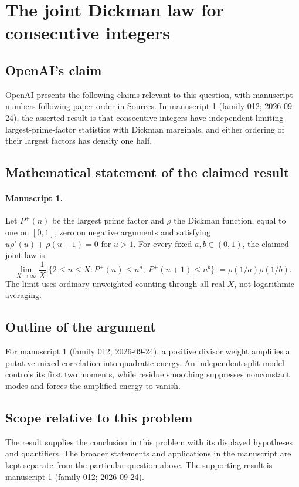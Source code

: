\documentclass[11pt]{article}
\begin{document}
\section*{The joint Dickman law for consecutive integers}

\subsection{OpenAI's claim}
OpenAI presents the following claims relevant to this question, with manuscript numbers following paper order in Sources. In manuscript 1 (family 012; 2026-09-24), the asserted result is that consecutive integers have independent limiting largest-prime-factor statistics with Dickman marginals, and either ordering of their largest factors has density one half.

\subsection{Mathematical statement of the claimed result}
\paragraph{Manuscript 1.}
Let $P^+(n)$ be the largest prime factor and $\rho$ the Dickman function, equal to one on $[0,1]$, zero on negative arguments and satisfying $u\rho'(u)+\rho(u-1)=0$ for $u>1$. For every fixed $a,b\in(0,1)$, the claimed joint law is
\[
 \lim_{X\to\infty}\frac1X|\{2\le n\le X:P^+(n)\le n^a,\ P^+(n+1)\le n^b\}|
 =\rho(1/a)\rho(1/b).
\]
The limit uses ordinary unweighted counting through all real $X$, not logarithmic averaging.

\subsection{Outline of the argument}
For manuscript 1 (family 012; 2026-09-24), a positive divisor weight amplifies a putative mixed correlation into quadratic energy. An independent split model controls its first two moments, while residue smoothing suppresses nonconstant modes and forces the amplified energy to vanish.

\subsection{Scope relative to this problem}
The result supplies the conclusion in this problem with its displayed hypotheses and quantifiers. The broader statements and applications in the manuscript are kept separate from the particular question above. The supporting result is manuscript 1 (family 012; 2026-09-24).
\end{document}
